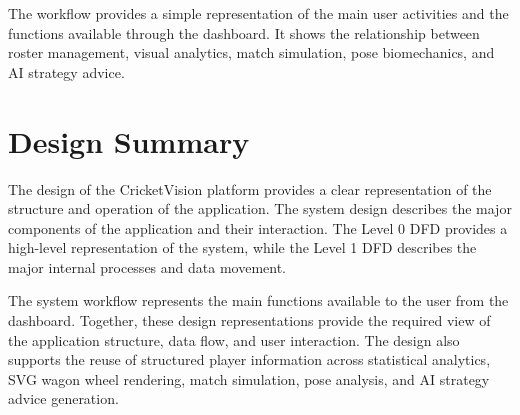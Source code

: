The workflow provides a simple representation of the main user activities and the functions available through the dashboard. It shows the relationship between roster management, visual analytics, match simulation, pose biomechanics, and AI strategy advice.

\section{Design Summary}
The design of the CricketVision platform provides a clear representation of the structure and operation of the application. The system design describes the major components of the application and their interaction. The Level 0 DFD provides a high-level representation of the system, while the Level 1 DFD describes the major internal processes and data movement.

The system workflow represents the main functions available to the user from the dashboard. Together, these design representations provide the required view of the application structure, data flow, and user interaction. The design also supports the reuse of structured player information across statistical analytics, SVG wagon wheel rendering, match simulation, pose analysis, and AI strategy advice generation.
